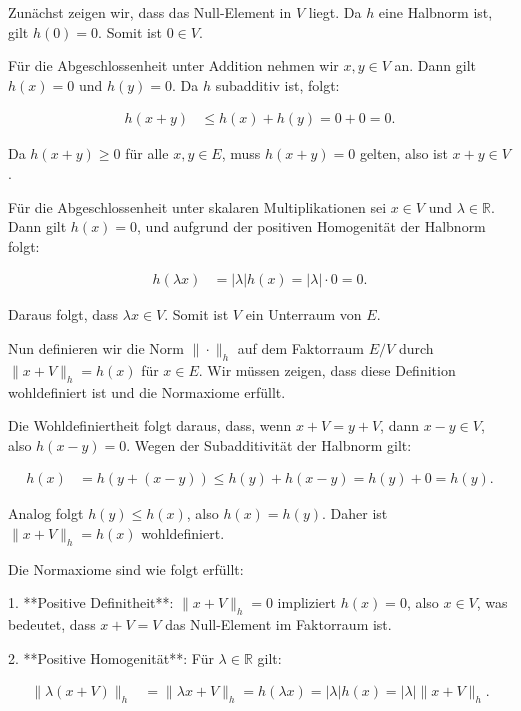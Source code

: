 \documentclass[11pt,a4paper]{article}
\begin{document}
Zunächst zeigen wir, dass das Null-Element in $V$ liegt. Da $h$ eine Halbnorm ist, gilt $h(0) = 0$. Somit ist $0 \in V$.

Für die Abgeschlossenheit unter Addition nehmen wir $x, y \in V$ an. Dann gilt $h(x) = 0$ und $h(y) = 0$. Da $h$ subadditiv ist, folgt:

\begin{align*}
h(x + y) &\leq h(x) + h(y) = 0 + 0 = 0.
\end{align*}

Da $h(x + y) \geq 0$ für alle $x, y \in E$, muss $h(x + y) = 0$ gelten, also ist $x + y \in V$.

Für die Abgeschlossenheit unter skalaren Multiplikationen sei $x \in V$ und $\lambda \in \mathbb{R}$. Dann gilt $h(x) = 0$, und aufgrund der positiven Homogenität der Halbnorm folgt:

\begin{align*}
h(\lambda x) &= |\lambda| h(x) = |\lambda| \cdot 0 = 0.
\end{align*}

Daraus folgt, dass $\lambda x \in V$. Somit ist $V$ ein Unterraum von $E$.

Nun definieren wir die Norm $\|\cdot\|_h$ auf dem Faktorraum $E / V$ durch $\|x + V\|_h = h(x)$ für $x \in E$. Wir müssen zeigen, dass diese Definition wohldefiniert ist und die Normaxiome erfüllt.

Die Wohldefiniertheit folgt daraus, dass, wenn $x + V = y + V$, dann $x - y \in V$, also $h(x - y) = 0$. Wegen der Subadditivität der Halbnorm gilt:

\begin{align*}
h(x) &= h(y + (x - y)) \leq h(y) + h(x - y) = h(y) + 0 = h(y).
\end{align*}

Analog folgt $h(y) \leq h(x)$, also $h(x) = h(y)$. Daher ist $\|x + V\|_h = h(x)$ wohldefiniert.

Die Normaxiome sind wie folgt erfüllt:

1. **Positive Definitheit**: $\|x + V\|_h = 0$ impliziert $h(x) = 0$, also $x \in V$, was bedeutet, dass $x + V = V$ das Null-Element im Faktorraum ist.

2. **Positive Homogenität**: Für $\lambda \in \mathbb{R}$ gilt:

\begin{align*}
\|\lambda(x + V)\|_h &= \|\lambda x + V\|_h = h(\lambda x) = |\lambda| h(x) = |\lambda| \|x + V\|_h.
\end{align*}
\end{document}
